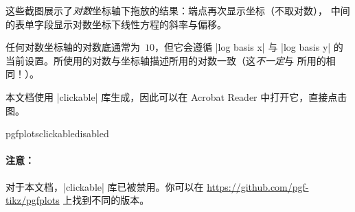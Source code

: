 \nobreak 这些截图展示了\emph{对数}坐标轴下拖放的结果：端点再次显示坐标（不取对数），
中间的表单字段显示对数坐标下线性方程的斜率与偏移。

任何对数坐标轴的对数底通常为~$10$，但它会遵循 |log basis x| 与 |log basis y| 的
当前设置。所使用的对数与坐标轴描述所用的对数一致（这\emph{不一定}与
\PGFPlotstable{} 所用的相同！）。

本文档使用 |clickable| 库生成，因此可以在 Acrobat Reader 中打开它，直接点击图。

    \expandafter\ifx\csname pgfplotsclickabledisabled\endcsname\relax
    \else
    \paragraph{注意：}
    对于本文档，|clickable| 库已被禁用。你可以在
    \url{https://github.com/pgf-tikz/pgfplots} 上找到不同的版本。
    \fi

